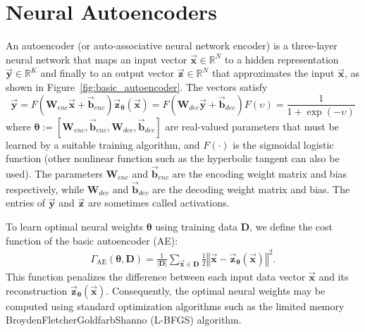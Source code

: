 \documentclass[a4paper,onecolumn,conference]{IEEEtran}
\begin{document}
\section{Neural Autoencoders}\label{sec:preliminaries}

An autoencoder (or auto-associative neural network encoder) is a three-layer neural network that maps an input vector $\vec{\mathbf{x}}\in\mathbb{R}^{N}$ to a hidden representation $\vec{\mathbf{y}}\in\mathbb{R}^{K}$ and finally to an output vector $\vec{\mathbf{z}} \in\mathbb{R}^{N}$ that approximates the input $\vec{\mathbf{x}}$, as shown in Figure~\ref{fig:basic_autoencoder}. The vectors satisfy
\begin{subequations}
\begin{equation}
\vec{\mathbf{y}}=F\left(\mathbf{W}_{enc}\vec{\mathbf{x}}+\vec{\mathbf{b}}_{enc}\right)
\end{equation}
\begin{equation}
\vec{\mathbf{z}}_{\boldsymbol{\theta} }(\vec{\mathbf{x}})=F\left(\mathbf{W}_{dec}\vec{\mathbf{y}}+\vec{\mathbf{b}}_{dec}\right)
\end{equation}
\begin{equation}
F\left(\upsilon\right)=\frac{1}{1+\exp(-\upsilon)}
\end{equation}
\end{subequations}
where $\boldsymbol{\theta} :=[\mathbf{W}_{enc},\vec{\mathbf{b}}_{enc},\mathbf{W}_{dec},\vec{\mathbf{b}}_{dec}]$ are real-valued parameters that must be learned by a suitable training algorithm, and $F\left(\cdot\right)$ is the sigmoidal logistic function (other nonlinear function such as the hyperbolic tangent can also be used). The parameters $\mathbf{W}_{enc}$ and $\vec{\mathbf{b}}_{enc}$ are the encoding weight matrix and bias respectively, while $\mathbf{W}_{dec}$ and $\vec{\mathbf{b}}_{dec}$ are the decoding weight matrix and bias. The entries of $\vec{\mathbf{y}}$ and $\vec{\mathbf{z}}$ are sometimes called activations.

To learn optimal neural weights $\boldsymbol{\theta}$ using training data $\mathbf{D}$, we define the cost function of the basic autoencoder (AE):
\begin{equation}\label{eq:cost_function}
\begin{aligned}\Gamma_{\text{AE}}\left(\boldsymbol{\theta},\mathbf{D}\right) =\frac{1}{\vert\mathbf{D}\vert }\sum_{\vec{\mathbf{x}}\in\mathbf{D}}{\frac{1}{2}\left\Vert \vec{\mathbf{x}}-\vec{\mathbf{z}}_{\boldsymbol{\theta} }(\vec{\mathbf{x}})\right\Vert ^{2}}.
\end{aligned}
\end{equation}
This function penalizes the difference between each input data vector $\vec{\mathbf{x}}$ and its reconstruction $\vec{\mathbf{z}}_{\boldsymbol{\theta} }(\vec{\mathbf{x}})$. Consequently, the optimal neural weights may be computed using standard optimization algorithms such as the limited memory Broyden\textendash{}Fletcher\textendash{}Goldfarb\textendash{}Shanno (L-BFGS) algorithm.
\end{document}
